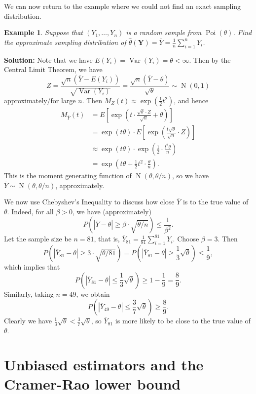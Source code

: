 \documentclass[10pt]{article}
\DeclareMathOperator{\Poi}{Poi}
\DeclareMathOperator{\Nor}{N}
\DeclareMathOperator{\Var}{Var}
\theoremstyle{newstyle}
\newtheorem{exmp}[thm]{Example}
\begin{document}
We can now return to the example where we could not find an exact sampling distribution. 

\begin{exmp}
Suppose that $(Y_1, \dots, Y_n)$ is a random sample from $\Poi(\theta)$. Find the approximate
sampling distribution of $\hat\theta(\mathbf Y) = \overline Y = \frac1n \sum_{i=1}^n Y_i$. 
\end{exmp}
{\color{blue}
{\bf Solution:} 
Note that we have $E(Y_i) = \Var(Y_i) = \theta < \infty$. Then by the Central Limit Theorem, we have 
\[ Z = \frac{\sqrt n(\overline Y - E(Y_i))}{\sqrt{\Var(Y_i)}} 
= \frac{\sqrt n(\overline Y - \theta)}{\sqrt\theta} \sim \Nor(0, 1) \]
approximately/for large $n$. Then $M_Z(t) \approx \exp(\frac12 t^2)$, and hence 
\begin{align*}
    M_{\overline Y}(t) 
    &= E \left[ \exp\left(t \cdot \frac{\sqrt\theta \cdot Z}{\sqrt n} + \theta \right) \right] \\
    &= \exp(t\theta) \cdot E \left[ \exp \left( \frac{t\sqrt\theta}{\sqrt n} \cdot Z \right) \right] \\
    &\approx \exp(t\theta) \cdot \exp \left( \frac12 \cdot \frac{t^2\theta}n \right) \\
    &= \exp\left( t\theta + \frac12 t^2 \cdot \frac\theta n \right). 
\end{align*}
This is the moment generating function of $\Nor(\theta, \theta/n)$, so we have 
$\overline Y \sim \Nor(\theta, \theta/n)$, approximately. 

We now use Chebyshev's Inequality to discuss how close $\overline Y$ is to the true value of 
$\theta$. Indeed, for all $\beta > 0$, we have (approximately)
\[ P\left(|\overline Y - \theta| \geq \beta \cdot \sqrt{\theta/n} \right) \leq \frac1{\beta^2}. \]
Let the sample size be $n = 81$, that is, $\overline{Y}_{81} = \frac1{81} \sum_{i=1}^{81} Y_i$. 
Choose $\beta = 3$. Then 
\[ P\left(|\overline Y_{81} - \theta| \geq 3 \cdot \sqrt{\theta/81} \right)
= P\left(|\overline Y_{81} - \theta| \geq \frac13 \sqrt{\theta} \right) \leq \frac19, \]
which implies that 
\[ P\left(|\overline Y_{81} - \theta| \leq \frac13 \sqrt{\theta} \right) \geq 1 - \frac19
= \frac89. \]
Similarly, taking $n = 49$, we obtain 
\[ P\left(|\overline Y_{49} - \theta| \leq \frac37 \sqrt{\theta} \right) \geq \frac89. \]
Clearly we have $\frac13\sqrt\theta < \frac37\sqrt\theta$, so $\overline Y_{81}$ is more likely 
to be close to the true value of $\theta$. 
}

\newpage 
\section{Unbiased estimators and the Cramer-Rao lower bound}
\end{document}
